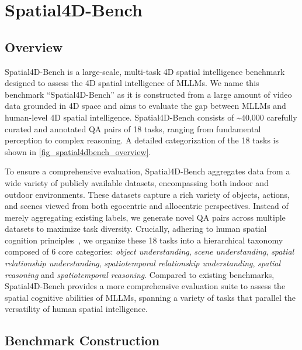 \documentclass{article}
\begin{document}


\section{Spatial4D-Bench}
\label{sibench}


\subsection{Overview}
\label{sibench_overview}
Spatial4D-Bench is a large-scale, multi-task 4D spatial intelligence benchmark designed to assess the 4D spatial intelligence of MLLMs.
We name this benchmark ``Spatial4D-Bench'' as it is constructed from a large amount of video data grounded in 4D space and aims to evaluate the gap between MLLMs and human-level 4D spatial intelligence.
Spatial4D-Bench consists of \textasciitilde40,000 carefully curated and annotated QA pairs of 18 tasks, ranging from fundamental perception to complex reasoning. A detailed categorization of the 18 tasks is shown in \cref{fig_spatial4dbench_overview}.%

To ensure a comprehensive evaluation, Spatial4D-Bench aggregates data from a wide variety of publicly available datasets, encompassing both indoor and outdoor environments.
These datasets capture a rich variety of objects, actions, and scenes viewed from both egocentric and allocentric perspectives.
Instead of merely aggregating existing labels, we generate novel QA pairs across multiple datasets to maximize task diversity. 
Crucially, adhering to human spatial cognition principles~\cite{waller2013handbook, newcombe2004spatial}, we organize these 18 tasks into a hierarchical taxonomy composed of 6 core categories: \textit{object understanding}, \textit{scene understanding}, \textit{spatial relationship understanding}, \textit{spatiotemporal relationship understanding}, \textit{spatial
reasoning} and \textit{spatiotemporal reasoning}.
Compared to existing benchmarks, Spatial4D-Bench provides a more comprehensive evaluation suite to assess the spatial cognitive abilities of MLLMs, spanning a variety of tasks that parallel the versatility of human spatial intelligence. 





\subsection{Benchmark Construction}
\label{subsec:construction}
\end{document}
